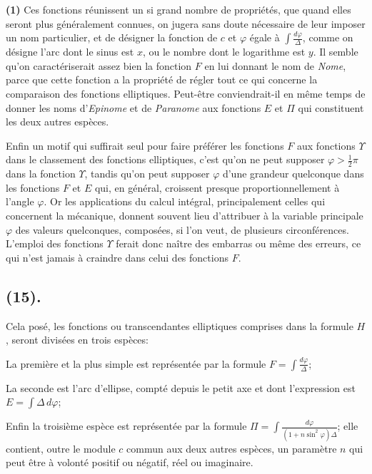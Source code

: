 \documentclass{article}
\begin{document}
\textbf{(1)} Ces fonctions réunissent un si grand nombre de propriétés, que quand elles seront plus généralement connues, on jugera sans doute nécessaire de leur imposer un nom particulier, et de désigner la fonction de $c$ et $\varphi$ égale à $\displaystyle\int\frac{d\varphi}{\Delta}$, comme on désigne l'arc dont le sinus est $x$, ou le nombre dont le logarithme est $y$. Il semble qu'on caractériserait assez bien la fonction $F$ en lui donnant le nom de \emph{Nome}, parce que cette fonction a la propriété de régler tout ce qui concerne la comparaison des fonctions elliptiques. Peut-être conviendrait-il en même temps de donner les noms d'\emph{Epinome} et de \emph{Paranome} aux fonctions $E$ et $\Pi$ qui constituent les deux autres espèces.


Enfin un motif qui suffirait seul pour faire préférer les fonctions $F$ aux fonctions $\Upsilon$ dans le classement des fonctions elliptiques, c'est qu'on ne peut supposer $\varphi>\tfrac{1}{2}\pi$ dans la fonction $\Upsilon$, tandis qu'on peut supposer $\varphi$ d'une grandeur quelconque dans les fonctions $F$ et $E$ qui, en général, croissent presque proportionnellement à l'angle $\varphi$. Or les applications du calcul intégral, principalement celles qui concernent la mécanique, donnent souvent lieu d'attribuer à la variable principale $\varphi$ des valeurs quelconques, composées, si l'on veut, de plusieurs circonférences. L'emploi des fonctions $\Upsilon$ ferait donc naître des embarras ou même des erreurs, ce qui n'est jamais à craindre dans celui des fonctions $F$.

\subsection*{(15).}

Cela posé, les fonctions ou transcendantes elliptiques comprises dans la formule $H$, seront divisées en trois espèces:

La première et la plus simple est représentée par la formule $F=\displaystyle\int\frac{d\varphi}{\Delta}$;

La seconde est l'arc d'ellipse, compté depuis le petit axe et dont l'expression est $E=\displaystyle\int\Delta\,d\varphi$;

Enfin la troisième espèce est représentée par la formule $\Pi=\displaystyle\int\frac{d\varphi}{(1+n\sin^{2}\varphi)\Delta}$; elle contient, outre le module $c$ commun aux deux autres espèces, un paramètre $n$ qui peut être à volonté positif ou négatif, réel ou imaginaire.
\end{document}
